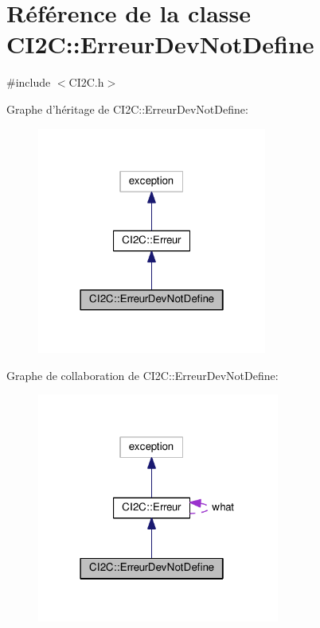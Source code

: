 \hypertarget{class_c_i2_c_1_1_erreur_dev_not_define}{\section{Référence de la classe C\+I2\+C\+:\+:Erreur\+Dev\+Not\+Define}
\label{class_c_i2_c_1_1_erreur_dev_not_define}
}


{\ttfamily \#include $<$C\+I2\+C.\+h$>$}



Graphe d'héritage de C\+I2\+C\+:\+:Erreur\+Dev\+Not\+Define\+:
\nopagebreak
\begin{figure}[H]
\begin{center}
\leavevmode
\includegraphics[width=214pt]{class_c_i2_c_1_1_erreur_dev_not_define__inherit__graph}
\end{center}
\end{figure}


Graphe de collaboration de C\+I2\+C\+:\+:Erreur\+Dev\+Not\+Define\+:
\nopagebreak
\begin{figure}[H]
\begin{center}
\leavevmode
\includegraphics[width=226pt]{class_c_i2_c_1_1_erreur_dev_not_define__coll__graph}
\end{center}
\end{figure}

